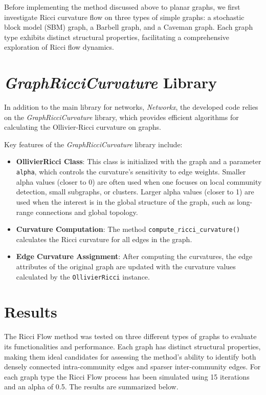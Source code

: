 Before implementing the method discussed above to planar graphs, we first investigate Ricci curvature flow on three types of simple graphs: a stochastic block model (SBM) graph, a Barbell graph, and a Caveman graph. Each graph type exhibits distinct structural properties, facilitating a comprehensive exploration of Ricci flow dynamics.

\section{\textit{GraphRicciCurvature} Library}
In addition to the main library for networks, \textit{Networkx}, the developed code relies on the \textit{GraphRicciCurvature} library, which provides efficient algorithms for calculating the Ollivier-Ricci curvature on graphs.

Key features of the \textit{GraphRicciCurvature} library include:

\begin{itemize}
    \item \textbf{OllivierRicci Class}: This class is initialized with the graph and a parameter \texttt{alpha}, which controls the curvature's sensitivity to edge weights. Smaller alpha values (closer to 0) are often used when one focuses on local community detection, small subgraphs, or clusters. Larger alpha values (closer to 1) are used when the interest is in the global structure of the graph, such as long-range connections and global topology.
    
    \item \textbf{Curvature Computation}: The method \texttt{compute\_ricci\_curvature()} calculates the Ricci curvature for all edges in the graph.
    
    \item \textbf{Edge Curvature Assignment}: After computing the curvatures, the edge attributes of the original graph are updated with the curvature values calculated by the \texttt{OllivierRicci} instance. 
\end{itemize}



\section{Results}

The Ricci Flow method was tested on three different types of graphs to evaluate its functionalities and performance. Each graph has distinct structural properties, making them ideal candidates for assessing the method’s ability to identify both densely connected intra-community edges and sparser inter-community edges. For each graph type the Ricci Flow process has been simulated using 15 iterations and an alpha of 0.5. The results are summarized below. 

